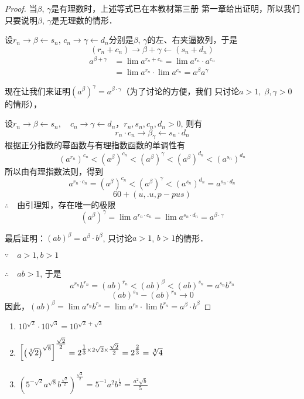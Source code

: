 \begin{proof}
当$\beta$, $\gamma$是有理数时，上述等式已在本教材第三册
第一章给出证明，所以我们只要说明$\beta$, $\gamma$是无理数的情形．

设$r_n\to\beta\leftarrow s_n$, $c_n\to\gamma\leftarrow d_n$分别是$\beta$, $\gamma$的左、右夹逼数列，于是
\[(r_n+c_n)\to \beta+\gamma \leftarrow (s_n+d_n)\]
\[\begin{split}
  a^{\beta+\gamma}&=\lim a^{r_n+c_n}=\lim a^{r_n}\cdot a^{c_n}\\
  &=\lim a^{r_n}\cdot \lim a^{c_n}=a^{\beta}a^{\gamma}
\end{split}\]

现在让我们来证明$(a^{\beta})^{\gamma}=a^{\beta\cdot \gamma}$（为了讨论的方便，我们
只讨论$a>1,\; \beta ,\gamma>0$的情形），

设$r_n\to \beta \leftarrow s_n,\quad c_n\to \gamma\leftarrow d_n$，$r_n, s_n,c_n,d_n>0$, 则有
\[r_n\cdot c_n\to \beta_{\gamma}\leftarrow s_n\cdot d_n\]
根据正分指数的幂函数与有理指数函数的单调性有
\[(a^{r_n})^{c_n}<(a^{\beta})^{c_n}<(a^{\beta})^{\gamma}<(a^{\beta})^{d_n}<(a^{s_n})^{d_n}\]
所以由有理指数法则，得到
\[a^{r_n\cdot c_n}=(a^{\beta})^{c_n}<(a^{\beta})^{\gamma}<(a^{s_n})^{d_n}=a^{s_n\cdot d_n}\]
\[60+(u,.u,p-pus)\]
$\therefore\quad $由引理知，存在唯一的极限
\[(a^{\beta})^{\gamma}=\lim a^{r_n\cdot c_n} =\lim a^{s_n\cdot d_n} =a^{\beta\cdot \gamma}\]

最后证明：$(ab)^{\beta}=a^{\beta}\cdot b^{\beta}$, 只讨论$a>1$, $b>1$的情形．

$\because\quad a>1,b>1$

$\therefore\quad ab>1$, 于是
\[a^{r_n}b^{r_n}=(ab)^{r_n}<(ab)^{\beta}<(ab)^{s_n}=a^{s_n}b^{s_n}\]
\[(ab)^{s_n}-(ab)^{r_n}\to 0\]
因此，$(ab)^{\beta}=\lim a^{r_n}b^{r_n} = \lim a^{r_n}\cdot \lim b^{r_n}=a^{\beta}\cdot b^{\beta}$
\end{proof}

\begin{example}
  \begin{enumerate}
    \item $10^{\sqrt{2}}\cdot 10^{\sqrt{3}}=10^{\sqrt{2}+\sqrt{3}}$
    \item  $\left[\left(\sqrt[3]{2}\right)^{\sqrt{8}}\right]^{\tfrac{\sqrt{2}}{2}}=2^{\tfrac{1}{3}\times 2\sqrt{2}\times\tfrac{\sqrt{2}}{2}}=2^{\tfrac{2}{3}}=\sqrt[3]{4}$
    \item $\left(5^{-\sqrt{2}}a^{\sqrt{8}}b^{\tfrac{\sqrt{2}}{2}}\right)^{\tfrac{\sqrt{2}}{2}}=5^{-1}a^{2}b^{\tfrac{1}{2}} =\frac{a^2\sqrt{b}}{5} $
  \end{enumerate}
\end{example}

